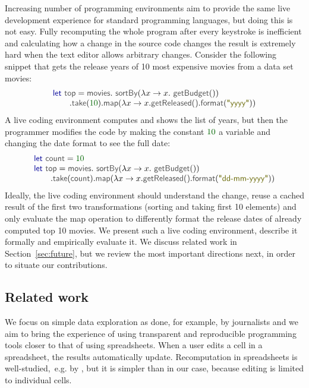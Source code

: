 \documentclass[acmsmall,anonymous,fleqn]{acmart}\settopmatter{printfolios=false,printccs=false,printacmref=false}
\theoremstyle{plain}
\theoremstyle{definition}
\newcommand{\num}[1]{\textcolor{numclr}{#1}}
\newcommand{\str}[1]{\textnormal{\textcolor{strclr}{\sffamily "#1"}}}
\newcommand{\ident}[1]{\textnormal{\textcolor{idclr}{\sffamily #1}}}
\newcommand{\kvd}[1]{\textnormal{\textcolor{kvdclr}{\sffamily #1}}}
\begin{document}
Increasing number of programming environments aim to provide the same live development experience
for standard programming languages, but doing this is not easy. Fully recomputing the whole program
after every keystroke is inefficient and calculating how a change in the source code changes the
result is extremely hard when the text editor allows arbitrary changes.
Consider the following snippet that gets the release years of 10 most expensive movies from a
data set \ident{movies}:
%
\begin{equation*}
\begin{array}{l}
\kvd{let}~\ident{top} =\ident{movies}.\ident{sortBy}(\lambda x \rightarrow x.\ident{getBudget}())\\
\qquad .\ident{take}(\num{10}).\ident{map}(\lambda x \rightarrow x.\ident{getReleased()}.\ident{format}(\str{yyyy}))\\
\end{array}
\end{equation*}
%
A live coding environment computes and shows the list of years, but then the programmer modifies the code by
making the constant $\num{10}$ a variable and changing the date format to see the full date:
%
\begin{equation*}
\begin{array}{l}
\kvd{let}~\ident{count} = \num{10}\\
\kvd{let}~\ident{top} = \ident{movies}.\ident{sortBy}(\lambda x \rightarrow x.\ident{getBudget}())\\
\qquad .\ident{take}(\ident{count}).\ident{map}(\lambda x \rightarrow x.\ident{getReleased()}.\ident{format}(\str{dd-mm-yyyy}))\\
\end{array}
\end{equation*}
%
Ideally, the live coding environment should understand the change, reuse a cached result of the
first two transformations (sorting and taking first 10 elements) and only evaluate the
\ident{map} operation to differently format the release dates of already computed top 10 movies.
We present such a live coding environment, describe it formally and empirically evaluate it.
We discuss related work in Section~\ref{sec:future}, but we review the most important directions
next, in order to situate our contributions.

\subsection{Related work}
We focus on simple data exploration as done, for example, by journalists \cite{ddj}
and we aim to bring the experience of using transparent and reproducible programming tools
closer to that of using spreadsheets. When a user edits a cell in a spreadsheet, the results
automatically update. Recomputation in spreadsheets is well-studied,~e.g. by \citet{spreadsheet},
but it is simpler than in our case, because editing is limited to individual cells.
\end{document}
